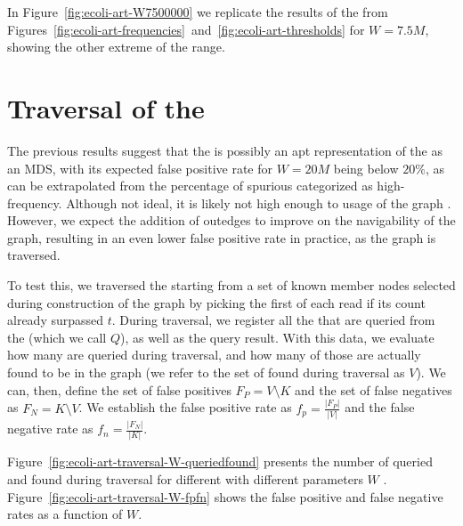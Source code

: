 In Figure~\ref{fig:ecoli-art-W7500000} we replicate the results of the \dBCM from Figures~\ref{fig:ecoli-art-frequencies}~and~\ref{fig:ecoli-art-thresholds} for $W = 7.5M$, showing the other extreme of the range. 

\section{Traversal of the \dBCM}
\label{sec:results-dbcm-traversal}

The previous results suggest that the \dBCM is possibly an apt representation of the \dBG as an MDS, with its expected false positive rate for $W = 20M$ being below $20\%$, as can be extrapolated from the percentage of spurious  categorized as high-frequency. Although not ideal, it is likely not high enough to  usage of the graph \cite{Pell2012}. However, we expect the addition of outedges to improve on the navigability of the graph, resulting in an even lower false positive rate in practice, as the graph is traversed.

To test this, we traversed the \dBCM starting from a set of known member nodes selected during construction of the graph by picking the first \kmer of each read if its count already surpassed $t$. During traversal, we register all the  that are queried from the \dBCM (which we call $Q$), as well as the query result. With this data, we evaluate how many  are queried during traversal, and how many of those are actually found to be in the graph (we refer to the set of  found during traversal as $V$). We can, then, define the set of false positives $F_P = V \setminus K$ and the set of false negatives as $F_N = K \setminus V$. We establish the false positive rate as $f_p = \frac{|F_P|}{|V|}$ and the false negative rate as $f_n = \frac{|F_N|}{|K|}$.


Figure~\ref{fig:ecoli-art-traversal-W-queriedfound} presents the number of  queried and found during traversal for different \dBCM with different parameters $W$ . Figure~\ref{fig:ecoli-art-traversal-W-fpfn} shows the false positive and false negative rates as a function of $W$.

